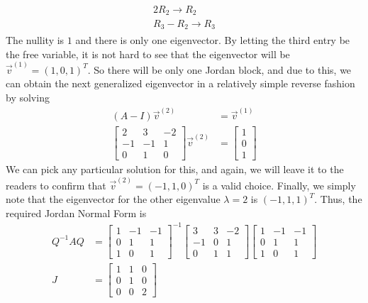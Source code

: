 \begin{solution}
\begin{align*}
\begin{aligned}
2R_2 \to R_2 \\
R_3 - R_2 \to R_3
\end{aligned}
\end{align*}
The nullity is $1$ and there is only one eigenvector. By letting the third entry be the free variable, it is not hard to see that the eigenvector will be $\vec{v}^{(1)} = (1,0,1)^T$. So there will be only one Jordan block, and due to this, we can obtain the next generalized eigenvector in a relatively simple reverse fashion by solving
\begin{align*}
(A - I)\vec{v}^{(2)} &= \vec{v}^{(1)} \\
\begin{bmatrix}
2 & 3 & -2\\ 
-1 & -1 & 1\\ 
0 & 1 & 0
\end{bmatrix}
\vec{v}^{(2)} &=
\begin{bmatrix}
1 \\
0 \\
1
\end{bmatrix}
\end{align*}
We can pick any particular solution for this, and again, we will leave it to the readers to confirm that $\vec{v}^{(2)} = (-1,1,0)^T$ is a valid choice. Finally, we simply note that the eigenvector for the other eigenvalue $\lambda = 2$ is $(-1,1,1)^T$. Thus, the required Jordan Normal Form is
\begin{align*}
Q^{-1}AQ &= 
\begin{bmatrix}
1 & -1 & -1\\
0 & 1 & 1\\
1 & 0 & 1
\end{bmatrix}^{-1}
\begin{bmatrix}
3&3&-2\\ 
-1&0&1\\ 
0&1&1
\end{bmatrix}
\begin{bmatrix}
1 & -1 & -1\\
0 & 1 & 1\\
1 & 0 & 1
\end{bmatrix} \\
J &=
\begin{bmatrix}
1 & 1 & 0 \\
0 & 1 & 0 \\
0 & 0 & 2
\end{bmatrix}
\end{align*}
\end{solution}

